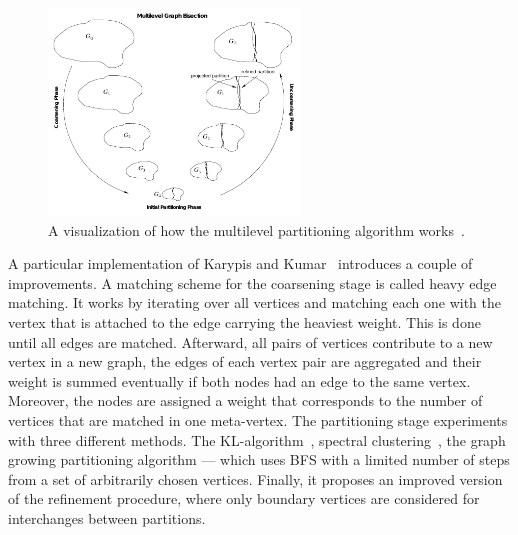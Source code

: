                 \begin{figure}[htp]
                    \begin{center}
                        \includegraphics[keepaspectratio,width=0.6\textwidth]{img/03-graphs/multilevel.png}
                    \end{center}
                    \caption{A visualization of how the multilevel partitioning algorithm works~\autocite{karypis}.} 
                    \label{mlp-fig}
                \end{figure}
                    
                A particular implementation of Karypis and Kumar~\autocite{karypis} introduces a couple of improvements.
                A matching scheme for the coarsening stage is called heavy edge matching.
                It works by iterating over all vertices and matching each one with the vertex that is attached to the edge carrying the heaviest weight.
                This is done until all edges are matched.
                Afterward, all pairs of vertices contribute to a new vertex in a new graph, the edges of each vertex pair are aggregated and their weight is summed eventually if both nodes had an edge to the same vertex. 
                Moreover, the nodes are assigned a weight that corresponds to the number of vertices that are matched in one meta-vertex.
                The partitioning stage experiments with three different methods. The KL-algorithm~\autocite{kl}, spectral clustering~\autocite{spectral}, the graph growing partitioning algorithm --- which uses BFS with a limited number of steps from a set of arbitrarily chosen vertices.
                Finally, it proposes an improved version of the refinement procedure, where only boundary vertices are considered for interchanges between partitions.
                
